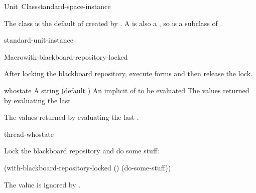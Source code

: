 \documentclass[10pt,twoside,english,pdftex]{article}
\begin{document}
\begin{functiondoc}{Unit~Class}{standard-space-instance}{}
%
%

\fnsyntax

\fnpackage {}

\fnmodule {}

\fndescription {}%
%
%
The class  is the default 
of  created by
.  A 
is also a , so  is
a subclass of .

\begin{alsos}{standard-unit-instance}
\end{alsos}

\end{functiondoc}


\begin{functiondoc}{Macro}{with-blackboard-repository-locked}{%
    }
%
%

\fnsyntax

\fnpurpose After locking the blackboard repository,
execute forms and then release the lock.

\fnpackage {}

\fnmodule {}

\fnargs
\begin{args}{whostate}
\arg[whostate] A string (default 
)
\arg[forms] An implicit  of  to be evaluated
\arg[results] The values returned by evaluating the last 
\end{args}

\fnreturns The values returned by evaluating the last .

\begin{alsos}{thread-whostate}
\end{alsos}

\fnexample
Lock the blackboard repository and do some stuff:
%
\W\supp
\begin{example}
  (with-blackboard-repository-locked ()
    (do-some-stuff))
\end{example}

\fnnote The  value is ignored by
.

\end{functiondoc}
\end{document}
